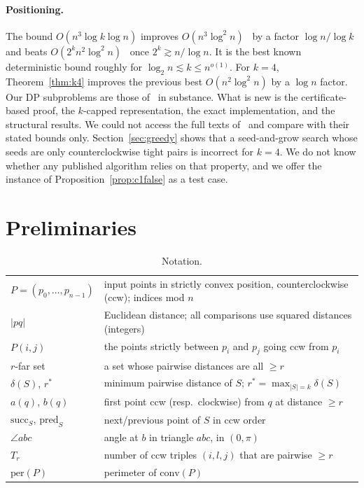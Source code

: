 \documentclass[11pt,a4paper]{article}
\theoremstyle{definition}
\newcommand{\opt}{r^{*}}
\newcommand{\arc}[2]{P(#1,#2)}
\newcommand{\ang}{\angle}
\begin{document}
\paragraph{Positioning.} The bound $O(n^3\log k\log n)$ improves
$O(n^3\log^2n)$~\cite{TW26} by a factor $\log n/\log k$ and beats
$O(2^kn^2\log^2n)$~\cite{SBM26} once $2^k\gtrsim n/\log n$. It is the best
known deterministic bound roughly for $\log_2n\lesssim k\le n^{o(1)}$. For
$k=4$, Theorem~\ref{thm:k4} improves the previous best $O(n^2\log^2n)$ by a
$\log n$ factor. Our DP subproblems are those of~\cite{TW25} in substance. What
is new is the certificate-based proof, the $k$-capped representation, the
exact implementation, and the structural results. We could not access the full
texts of~\cite{TW26,SBM26} and compare with their stated bounds only.
Section~\ref{sec:greedy} shows that a seed-and-grow search whose seeds are only
counterclockwise tight pairs is incorrect for $k=4$. We do not know whether any
published algorithm relies on that property, and we offer the instance of
Proposition~\ref{prop:c1false} as a test case.

\section{Preliminaries}

\begin{table}[h]
\centering
\caption{Notation.}
\small
\begin{tabular}{@{}l p{}@{}}
\toprule
$P=(p_0,\dots,p_{n-1})$ & input points in strictly convex position, counterclockwise (ccw); indices mod $n$\\
$|pq|$ & Euclidean distance; all comparisons use squared distances (integers)\\
$\arc ij$ & the points strictly between $p_i$ and $p_j$ going ccw from $p_i$\\
$r$-far set & a set whose pairwise distances are all $\ge r$\\
$\delta(S)$, $\opt$ & minimum pairwise distance of $S$; $\opt=\max_{|S|=k}\delta(S)$\\
$a(q)$, $b(q)$ & first point ccw (resp.\ clockwise) from $q$ at distance $\ge r$\\
$\mathrm{succ}_S$, $\mathrm{pred}_S$ & next/previous point of $S$ in ccw order\\
$\ang abc$ & angle at $b$ in triangle $abc$, in $(0,\pi)$\\
$T_r$ & number of ccw triples $(i,l,j)$ that are pairwise $\ge r$\\
$\mathrm{per}(P)$ & perimeter of $\mathrm{conv}(P)$\\
\bottomrule
\end{tabular}
\end{table}
\end{document}
